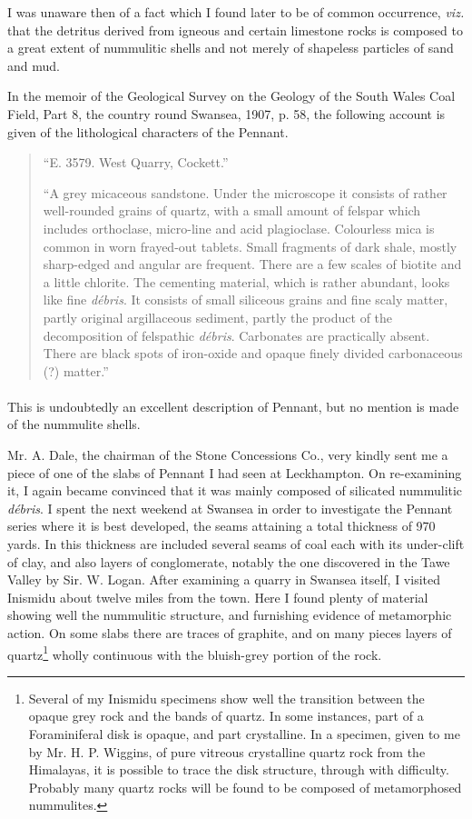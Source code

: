 \documentclass[a4paper, 12pt, oneside]{article}
\begin{document}
I was unaware then of a fact which I found later to be of common occurrence, \emph{viz.} that the detritus derived from igneous and certain limestone rocks is composed to a great extent of nummulitic shells and not merely of shapeless particles of sand and mud.

In the memoir of the Geological Survey on the Geology of the South Wales Coal Field, Part 8, the country round Swansea, 1907, p. 58, the following account is given of the lithological characters of the Pennant.

\begin{quote} 
``E. 3579. West Quarry, Cockett.''

``A grey micaceous sandstone. Under the microscope it consists of rather well-rounded grains of quartz, with a small amount of felspar which includes orthoclase, micro-line and acid plagioclase. Colourless mica is common in worn frayed-out tablets. Small fragments of dark shale, mostly sharp-edged and angular are frequent. There are a few scales of biotite and a little chlorite. The cementing material, which is rather abundant, looks like fine \emph{débris}. It consists of small siliceous grains and fine scaly matter, partly original argillaceous sediment, partly the product of the decomposition of felspathic \emph{débris}. Carbonates are practically absent. There are black spots of iron-oxide and opaque finely divided carbonaceous (?) matter.''
\end{quote}
\paragraph{}
This is undoubtedly an excellent description of Pennant, but no mention is made of the nummulite shells.

Mr. A. Dale, the chairman of the Stone Concessions Co., very kindly sent me a piece of one of the slabs of Pennant I had seen at Leckhampton. On re-examining it, I again became convinced that it was mainly composed of silicated nummulitic \emph{débris}. I spent the next weekend at Swansea in order to investigate the Pennant series where it is best developed, the seams attaining a total thickness of 970 yards. In this thickness are included several seams of coal each with its under-clift of clay, and also layers of conglomerate, notably the one discovered in the Tawe Valley by Sir. W. Logan. After examining a quarry in Swansea itself, I visited Inismidu about twelve miles from the town. Here I found plenty of material showing well the nummulitic structure, and furnishing evidence of metamorphic action. On some slabs there are traces of graphite, and on many pieces layers of quartz\footnote{Several of my Inismidu specimens show well the transition between the opaque grey rock and the bands of quartz. In some instances, part of a Foraminiferal disk is opaque, and part crystalline. In a specimen, given to me by Mr. H. P. Wiggins, of pure vitreous crystalline quartz rock from the Himalayas, it is possible to trace the disk structure, through with difficulty. Probably many quartz rocks will be found to be composed of metamorphosed nummulites.} wholly continuous with the bluish-grey portion of the rock.
\end{document}
